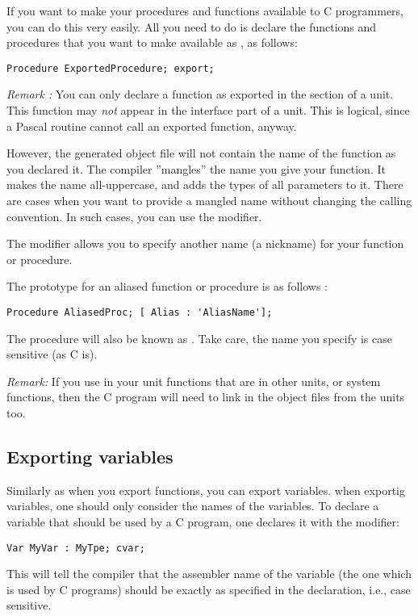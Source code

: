 \documentclass{report}
\begin{document}
If you want to make your procedures and functions available to C
programmers, you can do this very easily. All you need to do is declare the
functions and procedures that you want to make available as , as
follows:
\begin{verbatim}
Procedure ExportedProcedure; export;
\end{verbatim}

{\em Remark :} You can only declare a function as exported in the
 section of a unit. This function may {\em not} appear
in the interface part of a unit. This is logical, since a Pascal routine
cannot call an exported function, anyway.

However, the generated object file will not contain the name of the function
as you declared it. The \fpc compiler ''mangles'' the name you give your
function. It makes the name all-uppercase, and adds the types of all
parameters to it. There are cases when you want to provide a mangled name
without changing the calling convention. In such cases, you can use the
 modifier.

The  modifier allows you to specify
another name (a nickname) for your function or procedure.

The prototype for an aliased function or procedure is as follows :
\begin{verbatim}
Procedure AliasedProc; [ Alias : 'AliasName'];
\end{verbatim}
The procedure  will also be known as . Take
care, the name you specify is case sensitive (as C is).

{\em Remark: }
If you use in your unit functions that are in other units, or
system functions, then the C program will need to link in the object files
from the units too.

\subsection{Exporting variables}

Similarly as when you export functions, you can export variables.
when exportig variables, one should only consider the names of the
variables. To declare a variable that should be used by a C program,
one declares it with the  modifier:
\begin{verbatim}
Var MyVar : MyTpe; cvar;
\end{verbatim}
This will tell the compiler that the assembler name of the variable (the one
which is used by C programs) should be exactly as specified in the
declaration, i.e., case sensitive.
\end{document}
